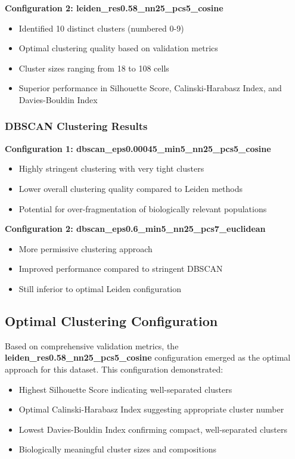 \documentclass[12pt,a4paper]{article}
\begin{document}
\textbf{Configuration 2: leiden\_res0.58\_nn25\_pcs5\_cosine}
\begin{itemize}
\item Identified 10 distinct clusters (numbered 0-9)
\item Optimal clustering quality based on validation metrics
\item Cluster sizes ranging from 18 to 108 cells
\item Superior performance in Silhouette Score, Calinski-Harabasz Index, and Davies-Bouldin Index
\end{itemize}

\subsubsection{DBSCAN Clustering Results}

\textbf{Configuration 1: dbscan\_eps0.00045\_min5\_nn25\_pcs5\_cosine}
\begin{itemize}
\item Highly stringent clustering with very tight clusters
\item Lower overall clustering quality compared to Leiden methods
\item Potential for over-fragmentation of biologically relevant populations
\end{itemize}

\textbf{Configuration 2: dbscan\_eps0.6\_min5\_nn25\_pcs7\_euclidean}
\begin{itemize}
\item More permissive clustering approach
\item Improved performance compared to stringent DBSCAN
\item Still inferior to optimal Leiden configuration
\end{itemize}

\subsection{Optimal Clustering Configuration}

Based on comprehensive validation metrics, the \textbf{leiden\_res0.58\_nn25\_pcs5\_cosine} configuration emerged as the optimal approach for this dataset. This configuration demonstrated:

\begin{itemize}
\item Highest Silhouette Score indicating well-separated clusters
\item Optimal Calinski-Harabasz Index suggesting appropriate cluster number
\item Lowest Davies-Bouldin Index confirming compact, well-separated clusters
\item Biologically meaningful cluster sizes and compositions
\end{itemize}
\end{document}
